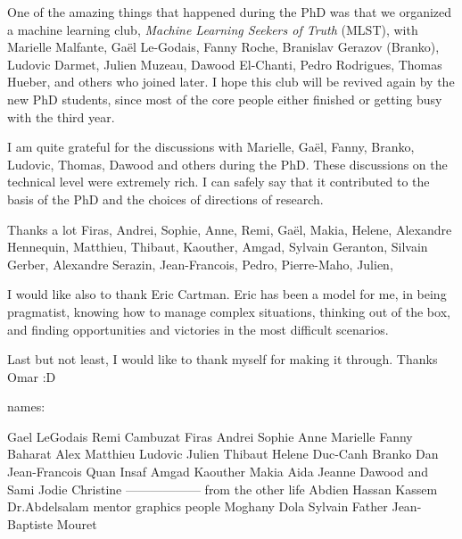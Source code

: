 \par One of the amazing things that happened during the PhD was that we organized a machine learning club, \textit{Machine Learning Seekers of Truth} (MLST), with Marielle Malfante, Ga\"{e}l Le-Godais, Fanny Roche, Branislav Gerazov (Branko), Ludovic Darmet, Julien Muzeau, Dawood El-Chanti, Pedro Rodrigues, Thomas Hueber, and others who joined later. I hope this club will be revived again by the new PhD students, since most of the core people either finished or getting busy with the third year.

\par I am quite grateful for the discussions with Marielle, Ga\"{e}l, Fanny, Branko, Ludovic, Thomas, Dawood and others during the PhD. These discussions on the technical level were extremely rich. I can safely say that it contributed to the basis of the PhD and the choices of directions of research.

\par Thanks a lot Firas, Andrei, Sophie, Anne, Remi, Ga\"{e}l, Makia, Helene, Alexandre Hennequin, Matthieu, Thibaut, Kaouther, Amgad, Sylvain Geranton, Silvain Gerber, Alexandre Serazin, Jean-Francois, Pedro, Pierre-Maho, Julien,

\par I would like also to thank Eric Cartman. Eric has been a model for me, in being pragmatist, knowing how to manage complex situations, thinking out of the box, and finding opportunities and victories in the most difficult scenarios.

\par Last but not least, I would like to thank myself for making it through. Thanks Omar :D

names:

Gael LeGodais
Remi Cambuzat
Firas
Andrei
Sophie
Anne
Marielle
Fanny
Baharat
Alex
Matthieu
Ludovic
Julien
Thibaut
Helene
Duc-Canh
Branko
Dan
Jean-Francois
Quan
Insaf
Amgad
Kaouther
Makia
Aida
Jeanne
Dawood and Sami
Jodie
Christine
------------------
from the other life
Abdien
Hassan
Kassem
Dr.Abdelsalam
mentor graphics people
Moghany
Dola
Sylvain
Father
Jean-Baptiste Mouret
